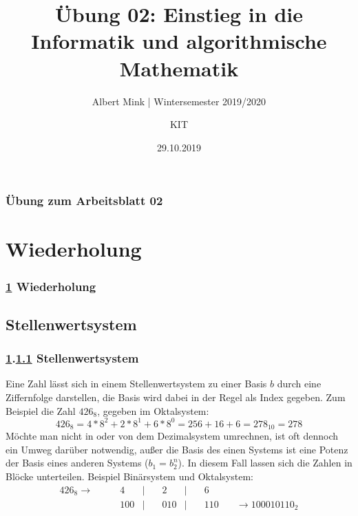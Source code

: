 \documentclass[c,18pt]{beamer}
\date{29.10.2019}
\title[Übung 02: Einstieg in die Informatik und algorithmische Mathematik]
  {Übung 02: Einstieg in die Informatik und algorithmische Mathematik}
\subtitle{Albert Mink | Wintersemester 2019/2020}
\author[Albert Mink, ]{KIT}
\institute[Institut für Angewandte und Numerische Mathematik (IANM)]{Institut für Angewandte und Numerische Mathematik}
\begin{document}
\begin{frame}
  \maketitle
\end{frame}
\begin{frame}
  \frametitle{Übung zum Arbeitsblatt 02}%
\tableofcontents
\end{frame}


\section{Wiederholung}\label{K:wdh}
\begin{frame}
  \frametitle{\ref{K:wdh} Wiederholung}%
\tableofcontents[current]
\end{frame}


\def\stitle{Stellenwertsystem}
\subsection{\stitle}\label{S:Stellenwertsystem}
\begin{frame}[fragile]%
  \frametitle{\ref{K:wdh}.\ref{S:Stellenwertsystem} \stitle}%

Eine Zahl l\"asst sich in einem Stellenwertsystem zu einer Basis $b$ durch eine Ziffernfolge darstellen, die Basis wird dabei in der Regel als Index gegeben.
Zum Beispiel die Zahl $426_8$, gegeben im Oktalsystem:
\begin{equation*}
426_8 = 4*8^2 + 2*8^1 + 6*8^0 = 256 + 16 + 6 = 278_{10} = 278
\end{equation*}
M\"ochte man nicht in oder von dem Dezimalsystem umrechnen, ist oft dennoch ein Umweg dar\"uber notwendig, au\ss er die Basis des einen Systems ist eine Potenz der Basis eines anderen Systems ($b_1 = b_2^n$).
In diesem Fall lassen sich die Zahlen in Bl\"ocke unterteilen.
Beispiel Bin\"arsystem und Oktalsystem:
\begin{align*}
426_8 \rightarrow \quad & \quad   4 & | & \quad   2 & | & \quad   6 & \\
                        & \quad 100 & | & \quad 010 & | & \quad 110 & \quad \rightarrow 100010110_2
\end{align*}

\end{frame}
\end{document}
